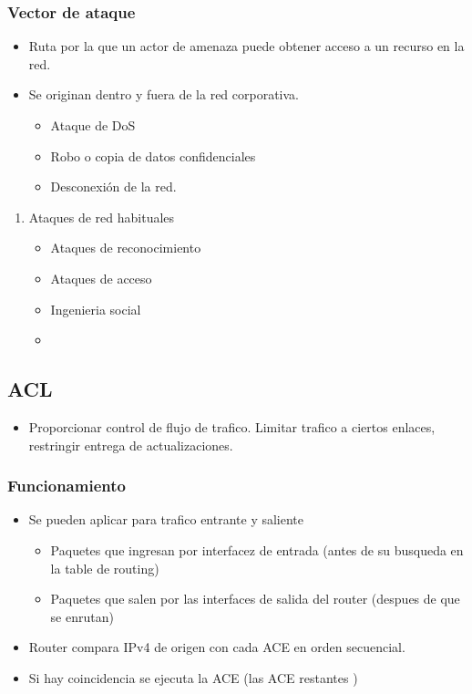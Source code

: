 \documentclass[11pt]{article}
\begin{document}
\subsubsection{Vector de ataque}
\label{sec:orgd8acf1f}
\begin{itemize}
\item Ruta por la que un actor de amenaza puede obtener acceso a un recurso en la red.
\item Se originan dentro y fuera de la red corporativa.
\begin{itemize}
\item Ataque de DoS
\item Robo o copia de datos confidenciales
\item Desconexión de la red.
\end{itemize}
\end{itemize}
\begin{enumerate}
\item Ataques de red habituales
\label{sec:org6c6ef13}
\begin{itemize}
\item Ataques de reconocimiento
\item Ataques de acceso
\item Ingenieria social
\item 
\end{itemize}
\end{enumerate}
\subsection{ACL}
\label{sec:orga8709d3}
\begin{itemize}
\item Proporcionar control de flujo de trafico. Limitar trafico a ciertos enlaces, restringir entrega de actualizaciones.
\end{itemize}
\subsubsection{Funcionamiento}
\label{sec:org4957850}
\begin{itemize}
\item Se pueden aplicar para trafico entrante y saliente
\begin{itemize}
\item Paquetes que ingresan por interfacez de entrada (antes de su busqueda en la table de routing)
\item Paquetes que salen por las interfaces de salida del router (despues de que se enrutan)
\end{itemize}
\item Router compara IPv4 de origen con cada ACE en orden secuencial.
\item Si hay coincidencia se ejecuta la ACE (las ACE restantes )
\end{itemize}
\end{document}

